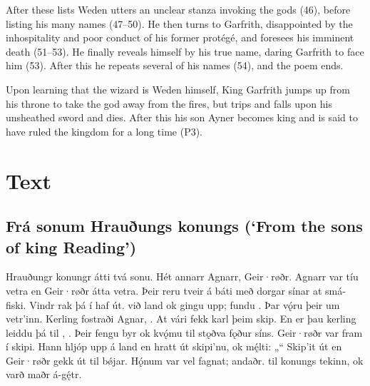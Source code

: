 After these lists Weden utters an unclear stanza invoking the gods (46), before listing his many names (47--50).  He then turns to Garfrith, disappointed by the inhospitality and poor conduct of his former protégé, and foresees his imminent death (51--53).  He finally reveals himself by his true name, daring Garfrith to face him (53).  After this he repeats several of his names (54), and the poem ends.

Upon learning that the wizard is Weden himself, King Garfrith jumps up from his throne to take the god away from the fires, but trips and falls upon his unsheathed sword and dies.  After this his son Ayner becomes king and is said to have ruled the kingdom for a long time (P3).

\newpage

\section{Text}

\subsection{Frá sonum Hrauðungs konungs (‘From the sons of king Reading’)}

\bpg\bpa{}%
Hrauðungr konungr átti tvá sonu. Hét annarr Agnarr,   Geir·røðr.
Agnarr var tíu vetra en Geir·røðr átta vetra. Þeir reru tveir á báti með dorgar sínar at smá-fiski.
Vindr rak þá í haf út.  við land ok gingu upp; fundu .
Þar vǫ́ru þeir um vetr’inn.  Kerling fostraði Agnar, .
At vári fekk karl þeim skip.  En er þau kerling leiddu þá til , .
Þeir fengu byr ok kvǫ́mu til stǫðva fǫður síns. Geir·røðr var fram í skipi.
Hann hljóp upp á land en hratt út skipi’nu, ok mę́lti: „“
Skip’it  út en Geir·røðr gekk út til bǿjar. Hǫ́num var vel fagnat;  andaðr.
 til konungs tekinn, ok varð maðr á-gę́tr.\epa

